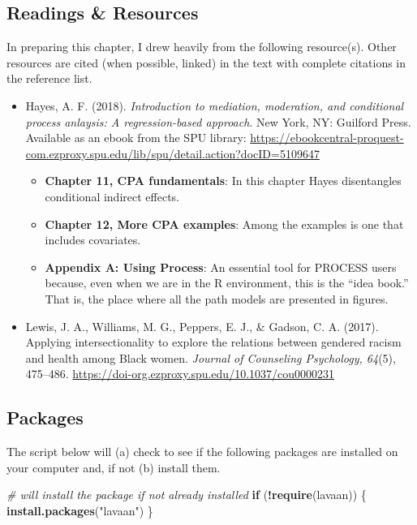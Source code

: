 \documentclass[
  11pt,
]{book}
\newenvironment{Shaded}{\begin{snugshade}}{\end{snugshade}}
\newcommand{\CommentTok}[1]{\textcolor[rgb]{0.37,0.37,0.37}{\textit{#1}}}
\newcommand{\ControlFlowTok}[1]{\textcolor[rgb]{0.27,0.27,0.27}{\textbf{#1}}}
\newcommand{\FunctionTok}[1]{\textcolor[rgb]{0.27,0.27,0.27}{\textbf{#1}}}
\newcommand{\NormalTok}[1]{#1}
\newcommand{\SpecialCharTok}[1]{\textcolor[rgb]{0.43,0.43,0.43}{\textbf{#1}}}
\newcommand{\StringTok}[1]{\textcolor[rgb]{0.5,0.5,0.5}{#1}}
\providecommand{\tightlist}{%
  \setlength{\itemsep}{0pt}\setlength{\parskip}{0pt}}
\begin{document}
\hypertarget{readings-resources-7}{%
\subsection{Readings \& Resources}\label{readings-resources-7}}

In preparing this chapter, I drew heavily from the following resource(s). Other resources are cited (when possible, linked) in the text with complete citations in the reference list.

\begin{itemize}
\tightlist
\item
  Hayes, A. F. (2018). \emph{Introduction to mediation, moderation, and conditional process anlaysis: A regression-based approach}. New York, NY: Guilford Press. Available as an ebook from the SPU library: \url{https://ebookcentral-proquest-com.ezproxy.spu.edu/lib/spu/detail.action?docID=5109647}

  \begin{itemize}
  \tightlist
  \item
    \textbf{Chapter 11, CPA fundamentals}: In this chapter Hayes disentangles conditional indirect effects.
  \item
    \textbf{Chapter 12, More CPA examples}: Among the examples is one that includes covariates.\\
  \item
    \textbf{Appendix A: Using Process}: An essential tool for PROCESS users because, even when we are in the R environment, this is the ``idea book.'' That is, the place where all the path models are presented in figures.
  \end{itemize}
\item
  Lewis, J. A., Williams, M. G., Peppers, E. J., \& Gadson, C. A. (2017). Applying intersectionality to explore the relations between gendered racism and health among Black women. \emph{Journal of Counseling Psychology, 64}(5), 475--486. \url{https://doi-org.ezproxy.spu.edu/10.1037/cou0000231}
\end{itemize}

\hypertarget{packages-7}{%
\subsection{Packages}\label{packages-7}}

The script below will (a) check to see if the following packages are installed on your computer and, if not (b) install them.

\begin{Shaded}
\begin{Highlighting}[]
\CommentTok{\# will install the package if not already installed}
\ControlFlowTok{if}\NormalTok{ (}\SpecialCharTok{!}\FunctionTok{require}\NormalTok{(lavaan)) \{}
    \FunctionTok{install.packages}\NormalTok{(}\StringTok{"lavaan"}\NormalTok{)}
\NormalTok{\}}
\end{Highlighting}
\end{Shaded}
\end{document}
